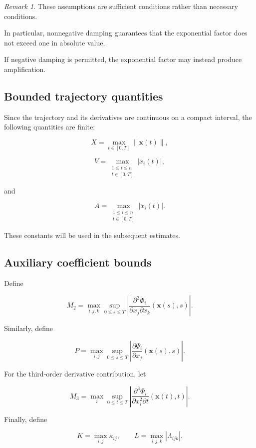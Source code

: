 \documentclass[12pt]{article}
\numberwithin{equation}{section}
\newcommand{\norm}[1]{\left\lVert #1 \right\rVert}
\theoremstyle{definition}
\theoremstyle{remark}
\newtheorem{remark}[theorem]{Remark}
\begin{document}
\begin{remark}

These assumptions are sufficient conditions
rather than necessary conditions.

In particular, nonnegative damping guarantees
that the exponential factor does not exceed
one in absolute value.

If negative damping is permitted, the
exponential factor may instead produce
amplification.

\end{remark}

\subsection{Bounded trajectory quantities}

Since the trajectory and its derivatives
are continuous on a compact interval,
the following quantities are finite:

\[
X=
\max_{t\in[0,T]}
\norm{\mathbf{x}(t)},
\]

\[
V=
\max_{\substack{1\leq i\leq n\\t\in[0,T]}}
|\dot{x}_i(t)|,
\]

and

\[
A=
\max_{\substack{1\leq i\leq n\\t\in[0,T]}}
|\ddot{x}_i(t)|.
\]

These constants will be used in the
subsequent estimates.

\subsection{Auxiliary coefficient bounds}

Define

\[
M_2=
\max_{i,j,k}
\sup_{0\leq s\leq T}
\left|
\frac{\partial^2\Phi_i}
{\partial x_j\partial x_k}
(\mathbf{x}(s),s)
\right|.
\]

Similarly, define

\[
P=
\max_{i,j}
\sup_{0\leq s\leq T}
\left|
\frac{\partial\Psi_i}
{\partial x_j}
(\mathbf{x}(s),s)
\right|.
\]

For the third-order derivative contribution,
let

\[
M_3=
\max_i
\sup_{0\leq t\leq T}
\left|
\frac{\partial^3\Phi_i}
{\partial x_i^2\partial t}
(\mathbf{x}(t),t)
\right|.
\]

Finally, define

\[
K=\max_{i,j}\kappa_{ij},
\qquad
L=\max_{i,j,k}|\Lambda_{ijk}|.
\]
\end{document}

